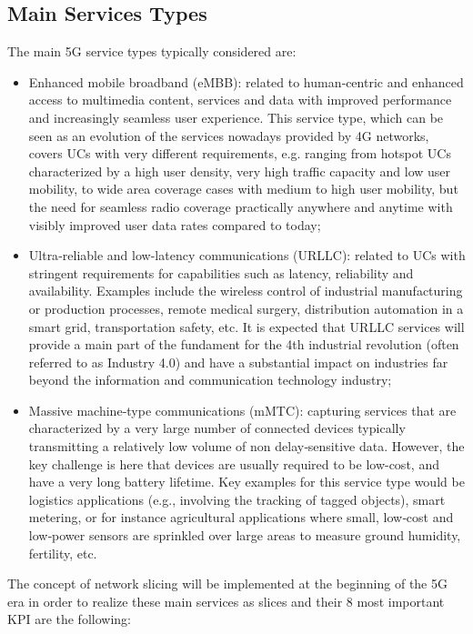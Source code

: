 \documentclass[a4paper,12pt]{report} %
\begin{document}
\subsection{Main Services Types}
The main 5G service types typically considered are:
\begin{itemize}
\item Enhanced mobile broadband (eMBB): related to human‐centric and enhanced access to multimedia content, services and data with improved performance and increasingly seamless user experience. This service type, which can be seen as an evolution of the services nowadays provided by
4G networks, covers UCs with very different requirements, e.g. ranging from hotspot UCs characterized by a high user density, very high traffic capacity and low user mobility, to wide area coverage cases with medium to high user mobility, but the need for seamless radio coverage practically
anywhere and anytime with visibly improved user data rates compared to today;
\end{itemize}
\begin{itemize}
\item Ultra‐reliable and low-latency communications (URLLC): related to UCs with stringent requirements for capabilities such as latency, reliability and availability. Examples include the wireless
control of industrial manufacturing or production processes, remote medical surgery, distribution automation in a smart grid, transportation safety, etc. It is expected that URLLC services will provide a main part of the fundament for the 4th industrial revolution (often referred to as
Industry 4.0) and have a substantial impact on industries far beyond the information and communication technology industry;
\end{itemize}
\begin{itemize}
\item Massive machine‐type communications (mMTC): capturing services that are characterized by
a very large number of connected devices typically transmitting a relatively low volume of non delay‐sensitive data. However, the key challenge is here that devices are usually required to be
low-cost, and have a very long battery lifetime. Key examples for this service type would be logistics applications (e.g., involving the tracking of tagged objects), smart metering, or for instance
agricultural applications where small, low‐cost and low‐power sensors are sprinkled over large
areas to measure ground humidity, fertility, etc.
\end{itemize}
The concept of network slicing will be implemented at the beginning of the 5G era in order to realize these main services as slices and their 8 most important KPI are the following:
\end{document}
